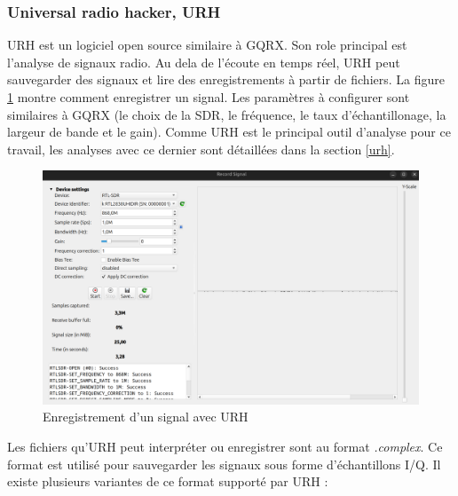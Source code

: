 \subsubsection{Universal radio hacker, URH}


\ac{URH} est un logiciel open source similaire à GQRX. Son role principal est l'analyse de signaux radio. Au dela de l'écoute en temps réel, URH peut sauvegarder des signaux et lire des enregistrements à partir de fichiers. La figure \ref{term39} montre comment enregistrer un signal. Les paramètres à configurer sont similaires à GQRX (le choix de la \ac{SDR}, le fréquence, le taux d'échantillonage, la largeur de bande et le gain). Comme \ac{URH} est le principal outil d'analyse pour ce travail, les analyses avec ce dernier sont détaillées dans la section \ref{urh}.

\begin{figure}[h]
\centering

\includegraphics[scale=0.16]{images/urh1.png}
\caption{Enregistrement d'un signal avec URH}\label{term39}
\end{figure}

\newpage

Les fichiers qu'\ac{URH} peut interpréter ou enregistrer sont au format \textit{.complex}. Ce format est utilisé pour sauvegarder les signaux sous forme d'échantillons \ac{I/Q}. Il existe plusieurs variantes de ce format supporté par \ac{URH} :

\vspace{0.1cm}

